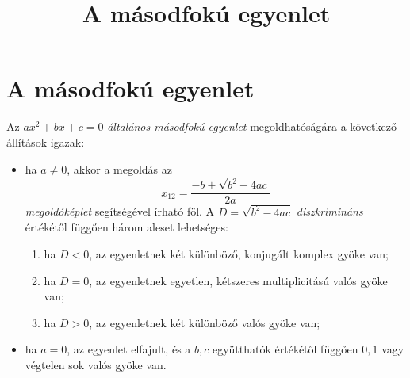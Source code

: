 \documentclass{article}
\title{A másodfokú egyenlet}
\date{}
\begin{document}
\section*{A másodfokú egyenlet}
Az $ax^2 + bx + c = 0$ \textit{általános másodfokú egyenlet} megoldhatóságára a következő állítások igazak:
\begin{itemize}
	\item ha $a\neq 0$, akkor a megoldás az 
	$$
	x_{12} = \frac{-b \pm \sqrt{b^2 - 4ac}}{2a}
	$$
	\textit{megoldóképlet} segítségével írható föl. A $D = \sqrt{b^2 - 4ac}$ \emph{diszkrimináns} értékétől függően három aleset lehetséges:
	\begin{enumerate}
		\item ha $D<0$, az egyenletnek két különböző, konjugált komplex gyöke van;
	     \item ha $D=0$, az egyenletnek egyetlen, kétszeres multiplicitású valós gyöke van;
	     \item ha $D>0$, az egyenletnek két különböző valós gyöke van;
	\end{enumerate}
	\item ha $a=0$, az egyenlet elfajult, és a $b,c$ együtthatók értékétől függően $0,1$ vagy végtelen sok valós gyöke van.	
\end{itemize}
\end{document}
